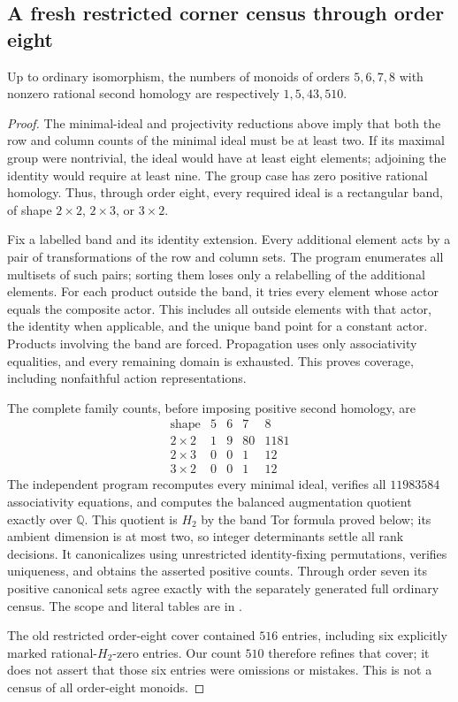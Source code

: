 \subsection{A fresh restricted corner census through order eight}
\begin{proposition}
\label{CP2:A-positive-corners-eight}
Up to ordinary isomorphism, the numbers of monoids of orders
$5,6,7,8$ with nonzero rational second homology are respectively
$1,5,43,510$.
\end{proposition}
\begin{proof}
The minimal-ideal and projectivity reductions above imply that both the
row and column counts of the minimal ideal must be at least two.
If its maximal group were nontrivial, the ideal would have at least
eight elements; adjoining the identity would require at least nine.
The group case has zero positive rational homology. Thus, through order
eight, every required ideal is a rectangular band, of shape $2\times2$,
$2\times3$, or $3\times2$.

Fix a labelled band and its identity extension. Every additional element
acts by a pair of transformations of the row and column sets. The program
 enumerates all multisets of such pairs;
sorting them loses only a relabelling of the additional elements.
For each product outside the band, it tries every element whose actor
equals the composite actor. This includes all outside elements with that
actor, the identity when applicable, and the unique band point for a
constant actor. Products involving the band are forced. Propagation uses
only associativity equalities, and every remaining domain is exhausted.
This proves coverage, including nonfaithful action representations.

The complete family counts, before imposing positive second homology, are
\[
\begin{array}{c|rrrr}
\text{shape}&5&6&7&8\\\hline
2\times2&1&9&80&1181\\
2\times3&0&0&1&12\\
3\times2&0&0&1&12
\end{array}
\]
The independent program 
recomputes every minimal ideal, verifies all $11983584$ associativity
equations, and computes the balanced augmentation quotient exactly over
$\mathbb Q$. This quotient is $H_2$ by the band Tor formula proved below;
its ambient dimension is at most two, so integer determinants settle all
rank decisions. It canonicalizes using unrestricted identity-fixing
permutations, verifies uniqueness, and obtains the asserted positive
counts. Through order seven its positive canonical sets agree exactly
with the separately generated full ordinary census. The scope and literal
tables are in .

The old restricted order-eight cover contained $516$ entries, including
six explicitly marked rational-$H_2$-zero entries. Our count $510$
therefore refines that cover; it does not assert that those six entries
were omissions or mistakes. This is not a census of all order-eight
monoids.
\end{proof}
